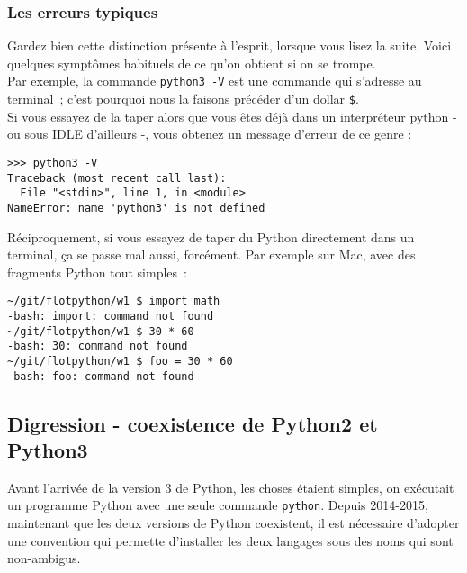     \hypertarget{les-erreurs-typiques}{%
\subsubsection{Les erreurs typiques}\label{les-erreurs-typiques}}

Gardez bien cette distinction présente à l'esprit, lorsque vous lisez la
suite. Voici quelques symptômes habituels de ce qu'on obtient si on se
trompe.\\

Par exemple, la commande \texttt{python3\ -V} est une commande qui
s'adresse au terminal~; c'est pourquoi nous la faisons précéder d'un
dollar \texttt{\$}.\\

Si vous essayez de la taper alors que vous êtes déjà dans un
interpréteur python - ou sous IDLE d'ailleurs -, vous obtenez un message
d'erreur de ce genre :

\begin{verbatim}
>>> python3 -V
Traceback (most recent call last):
  File "<stdin>", line 1, in <module>
NameError: name 'python3' is not defined
\end{verbatim}

    Réciproquement, si vous essayez de taper du Python directement dans un
terminal, ça se passe mal aussi, forcément. Par exemple sur Mac, avec
des fragments Python tout simples~:

\begin{verbatim}
~/git/flotpython/w1 $ import math
-bash: import: command not found
~/git/flotpython/w1 $ 30 * 60
-bash: 30: command not found
~/git/flotpython/w1 $ foo = 30 * 60
-bash: foo: command not found
\end{verbatim}

    \hypertarget{digression---coexistence-de-python2-et-python3}{%
\subsection{Digression - coexistence de Python2 et
Python3}\label{digression---coexistence-de-python2-et-python3}}

    Avant l'arrivée de la version 3 de Python, les choses étaient simples,
on exécutait un programme Python avec une seule commande
\texttt{python}. Depuis 2014-2015, maintenant que les deux versions de
Python coexistent, il est nécessaire d'adopter une convention qui
permette d'installer les deux langages sous des noms qui sont
non-ambigus.\\

